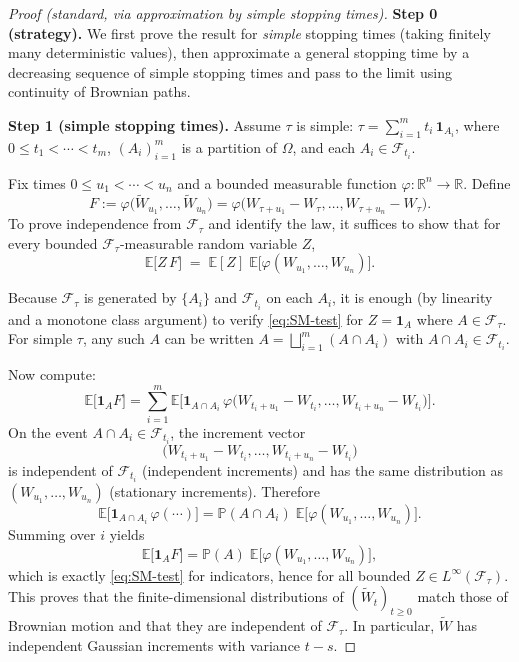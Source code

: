 \documentclass[11pt]{article}
\theoremstyle{definition}
\theoremstyle{remark}
\newcommand{\E}{\mathbb{E}}
\newcommand{\Pbb}{\mathbb{P}}
\newcommand{\R}{\mathbb{R}}
\newcommand{\cF}{\mathcal{F}}
\begin{document}
\begin{proof}[Proof (standard, via approximation by simple stopping times)]
\textbf{Step 0 (strategy).}
We first prove the result for \emph{simple} stopping times (taking finitely many deterministic values),
then approximate a general stopping time by a decreasing sequence of simple stopping times and pass to the limit
using continuity of Brownian paths.

\medskip
\textbf{Step 1 (simple stopping times).}
Assume $\tau$ is simple: $\tau=\sum_{i=1}^m t_i\,\mathbf 1_{A_i}$, where
$0\le t_1<\cdots<t_m$, $(A_i)_{i=1}^m$ is a partition of $\Omega$, and each $A_i\in \cF_{t_i}$.

Fix times $0\le u_1<\cdots<u_n$ and a bounded measurable function
$\varphi:\R^n\to\R$. Define
\[
F := \varphi\big(\widetilde W_{u_1},\ldots,\widetilde W_{u_n}\big)
=\varphi\big(W_{\tau+u_1}-W_\tau,\ldots,W_{\tau+u_n}-W_\tau\big).
\]
To prove independence from $\cF_\tau$ and identify the law, it suffices to show that for every bounded
$\cF_\tau$-measurable random variable $Z$,
\begin{equation}\label{eq:SM-test}
\E\big[ Z\,F\big] \;=\; \E[Z]\;\E\big[\varphi(W_{u_1},\ldots,W_{u_n})\big].
\end{equation}

Because $\cF_\tau$ is generated by $\{A_i\}$ and $\cF_{t_i}$ on each $A_i$,
it is enough (by linearity and a monotone class argument) to verify \eqref{eq:SM-test} for
$Z=\mathbf 1_A$ where $A\in\cF_\tau$. For simple $\tau$, any such $A$ can be written
$A=\bigsqcup_{i=1}^m (A\cap A_i)$ with $A\cap A_i\in \cF_{t_i}$.

Now compute:
\[
\E\big[\mathbf 1_A F\big]
=\sum_{i=1}^m \E\Big[\mathbf 1_{A\cap A_i}\,
\varphi\big(W_{t_i+u_1}-W_{t_i},\ldots,W_{t_i+u_n}-W_{t_i}\big)\Big].
\]
On the event $A\cap A_i\in\cF_{t_i}$, the increment vector
\[
\big(W_{t_i+u_1}-W_{t_i},\ldots,W_{t_i+u_n}-W_{t_i}\big)
\]
is independent of $\cF_{t_i}$ (independent increments) and has the same distribution as
$(W_{u_1},\ldots,W_{u_n})$ (stationary increments). Therefore
\[
\E\Big[\mathbf 1_{A\cap A_i}\,
\varphi(\cdots)\Big]
=\Pbb(A\cap A_i)\;
\E\big[\varphi(W_{u_1},\ldots,W_{u_n})\big].
\]
Summing over $i$ yields
\[
\E\big[\mathbf 1_A F\big]
=\Pbb(A)\;\E\big[\varphi(W_{u_1},\ldots,W_{u_n})\big],
\]
which is exactly \eqref{eq:SM-test} for indicators, hence for all bounded $Z\in L^\infty(\cF_\tau)$.
This proves that the finite-dimensional distributions of $(\widetilde W_t)_{t\ge0}$
match those of Brownian motion and that they are independent of $\cF_\tau$.
In particular, $\widetilde W$ has independent Gaussian increments with variance $t-s$.


\end{proof}
\end{document}
